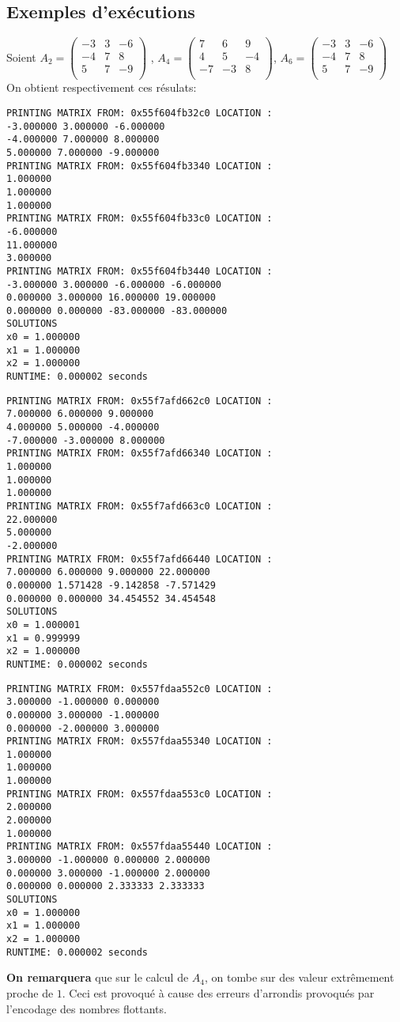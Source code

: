 \subsection{Exemples d'exécutions}

Soient $A_2 = \begin{pmatrix}
-3 & 3 & -6 \\
-4 & 7 &  8 \\
5 & 7 & -9 \\
\end{pmatrix}
$
,
$A_4 = \begin{pmatrix}
7 & 6 & 9 \\
4 & 5 &  -4\\
-7 & -3 & 8 \\
\end{pmatrix}
$,
$A_6 = \begin{pmatrix}
-3 & 3 & -6 \\
-4 & 7 &  8 \\
5 & 7 & -9 \\
\end{pmatrix}
$
\\
On obtient respectivement ces résulats:
\\
\begin{lstlisting}[caption=Matrix 2 results]
PRINTING MATRIX FROM: 0x55f604fb32c0 LOCATION :
-3.000000 3.000000 -6.000000
-4.000000 7.000000 8.000000
5.000000 7.000000 -9.000000
PRINTING MATRIX FROM: 0x55f604fb3340 LOCATION :
1.000000
1.000000
1.000000
PRINTING MATRIX FROM: 0x55f604fb33c0 LOCATION :
-6.000000
11.000000
3.000000
PRINTING MATRIX FROM: 0x55f604fb3440 LOCATION :
-3.000000 3.000000 -6.000000 -6.000000
0.000000 3.000000 16.000000 19.000000
0.000000 0.000000 -83.000000 -83.000000
SOLUTIONS
x0 = 1.000000
x1 = 1.000000
x2 = 1.000000
RUNTIME: 0.000002 seconds   
\end{lstlisting}
\begin{lstlisting}[caption=Matrix 4 results]
PRINTING MATRIX FROM: 0x55f7afd662c0 LOCATION :
7.000000 6.000000 9.000000
4.000000 5.000000 -4.000000
-7.000000 -3.000000 8.000000
PRINTING MATRIX FROM: 0x55f7afd66340 LOCATION :
1.000000
1.000000
1.000000
PRINTING MATRIX FROM: 0x55f7afd663c0 LOCATION :
22.000000
5.000000
-2.000000
PRINTING MATRIX FROM: 0x55f7afd66440 LOCATION :
7.000000 6.000000 9.000000 22.000000
0.000000 1.571428 -9.142858 -7.571429
0.000000 0.000000 34.454552 34.454548
SOLUTIONS
x0 = 1.000001
x1 = 0.999999
x2 = 1.000000
RUNTIME: 0.000002 seconds  
\end{lstlisting}
\begin{lstlisting}[caption=Matrix 6 results]
PRINTING MATRIX FROM: 0x557fdaa552c0 LOCATION :
3.000000 -1.000000 0.000000
0.000000 3.000000 -1.000000
0.000000 -2.000000 3.000000
PRINTING MATRIX FROM: 0x557fdaa55340 LOCATION :
1.000000
1.000000
1.000000
PRINTING MATRIX FROM: 0x557fdaa553c0 LOCATION :
2.000000
2.000000
1.000000
PRINTING MATRIX FROM: 0x557fdaa55440 LOCATION :
3.000000 -1.000000 0.000000 2.000000
0.000000 3.000000 -1.000000 2.000000
0.000000 0.000000 2.333333 2.333333
SOLUTIONS
x0 = 1.000000
x1 = 1.000000
x2 = 1.000000
RUNTIME: 0.000002 seconds                       
\end{lstlisting}
\textbf{On remarquera} que sur le calcul de $A_4$, on tombe sur des valeur extrêmement proche de $1$. Ceci est provoqué à cause des erreurs d'arrondis provoqués par l'encodage des nombres flottants.  